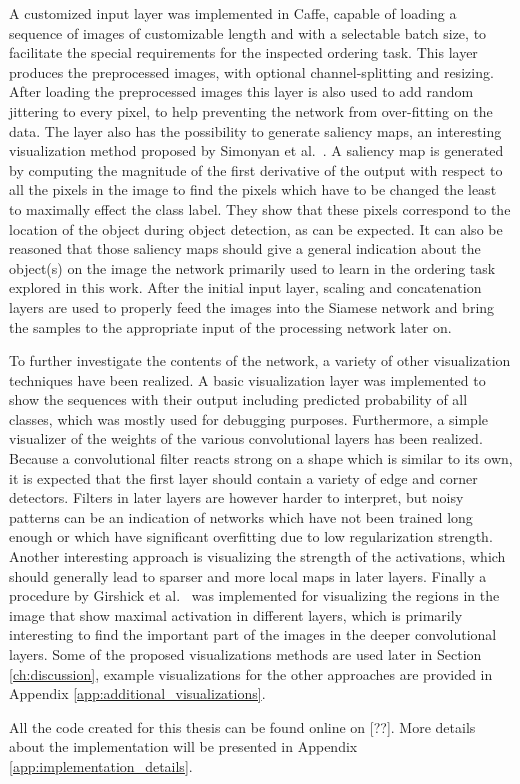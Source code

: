 A customized input layer was implemented in Caffe, capable of loading a sequence of images of customizable length and with a selectable batch size, to facilitate the special requirements for the inspected ordering task. This layer produces the preprocessed images, with optional channel-splitting and resizing. After loading the preprocessed images this layer is also used to add random jittering to every pixel, to help preventing the network from over-fitting on the data. The layer also has the possibility to generate saliency maps, an interesting visualization method proposed by Simonyan et al.~\cite{simonyan2013}. A saliency map is generated by computing the magnitude of the first derivative of the output with respect to all the pixels in the image to find the pixels which have to be changed the least to maximally effect the class label. They show that these pixels correspond to the location of the object during object detection, as can be expected. It can also be reasoned that those saliency maps should give a general indication about the object(s) on the image the network primarily used to learn in the ordering task explored in this work. After the initial input layer, scaling and concatenation layers are used to properly feed the images into the Siamese network and bring the samples to the appropriate input of the processing network later on.

To further investigate the contents of the network, a variety of other visualization techniques have been realized. A basic visualization layer was implemented to show the sequences with their output including predicted probability of all classes, which was mostly used for debugging purposes. Furthermore, a simple visualizer of the weights of the various convolutional layers has been realized. Because a convolutional filter reacts strong on a shape which is similar to its own, it is expected that the first layer should contain a variety of edge and corner detectors. Filters in later layers are however harder to interpret, but noisy patterns can be an indication of networks which have not been trained long enough or which have significant overfitting due to low regularization strength. Another interesting approach is visualizing the strength of the activations, which should generally lead to sparser and more local maps in later layers. Finally a procedure by Girshick et al.~\cite{girshick2014} was implemented for visualizing the regions in the image that show maximal activation in different layers, which is primarily interesting to find the important part of the images in the deeper convolutional layers. Some of the proposed visualizations methods are used later in Section \ref{ch:discussion}, example visualizations for the other approaches are provided in Appendix \ref{app:additional_visualizations}.

All the code created for this thesis can be found online on [??].  More details about the implementation will be presented in Appendix \ref{app:implementation_details}.
